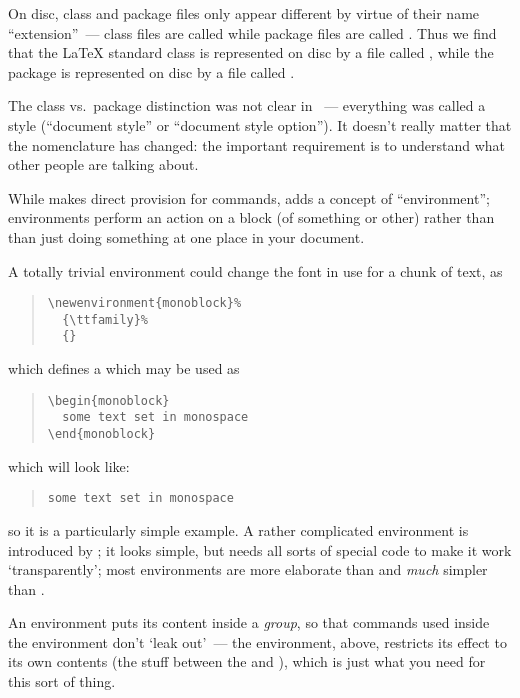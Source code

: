 On disc, class and package files only appear different by virtue of
their name ``extension''~--- class files are called  while
package files are called .  Thus we find that the \LaTeX{}
standard  class is represented on disc by a file called
, while the  package is
represented on disc by a file called .

The class vs.~package distinction was not clear in \LaTeXo{}~---
everything was called a style (``document style'' or ``document style
option'').  It doesn't really matter that the nomenclature has
changed: the important requirement is to understand what other people
are talking about.


While \tex{} makes direct provision for commands, \latex{} adds a
concept of ``environment''; environments perform an action on a block
(of something or other) rather than than just doing something at one
place in your document.

A totally trivial environment could change the font in use for a chunk
of text, as
\begin{quote}
\begin{verbatim}
\newenvironment{monoblock}%
  {\ttfamily}%
  {}
\end{verbatim}
\end{quote}
which defines a  which may be used as
\begin{quote}
\begin{verbatim}
\begin{monoblock}
  some text set in monospace
\end{monoblock}
\end{verbatim}
\end{quote}
which will look like:
\begin{quote}
  \texttt{some text set in monospace}
\end{quote}
so it is a particularly simple example.  A rather complicated
environment is introduced by ; it looks
simple, but needs all sorts of special \tex{} code to make it work
`transparently'; most environments are more elaborate than
 and \emph{much} simpler than
.

An environment puts its content inside a \tex{} \emph{group}, so that
commands used inside the environment don't `leak out'~--- the
 environment, above, restricts its effect to
its own contents (the stuff between the 
and ), which is just what you need for this
sort of thing.

